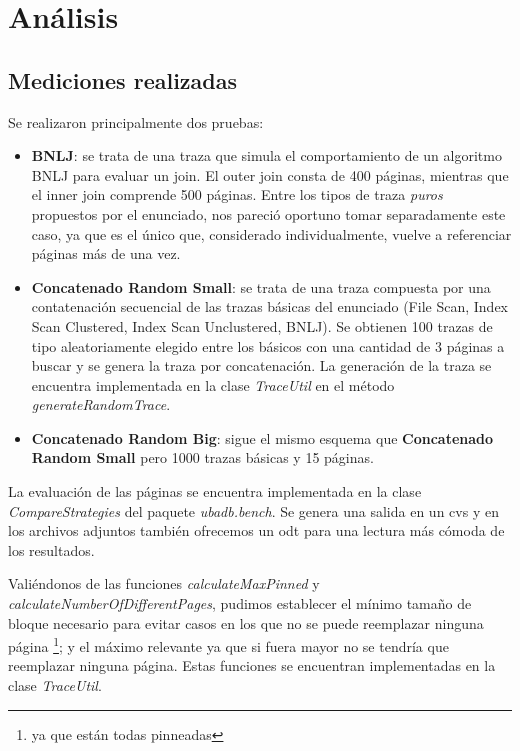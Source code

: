 \section{An\'alisis}

\subsection{Mediciones realizadas}
Se realizaron principalmente dos pruebas:

\begin{itemize}
\item \textbf{BNLJ}: se trata de una traza que simula el comportamiento de un algoritmo BNLJ para evaluar un join. El outer join consta de 400 p\'aginas, mientras que el inner join comprende 500 p\'aginas. Entre los tipos de traza \textit{puros} propuestos por el enunciado, nos pareci\'o oportuno tomar separadamente este caso, ya que es el \'unico que, considerado individualmente, vuelve a referenciar p\'aginas m\'as de una vez. 
\item \textbf{Concatenado Random Small}: se trata de una traza compuesta por una contatenaci\'on secuencial de las trazas b\'asicas del enunciado (File Scan, Index Scan Clustered, Index Scan Unclustered, BNLJ). Se obtienen 100 trazas de tipo aleatoriamente elegido entre los b\'asicos con una cantidad de 3 p\'aginas a buscar y se genera la traza por concatenaci\'on. La generaci\'on de la traza se encuentra implementada en la clase \textit{TraceUtil} en el m\'etodo \textit{generateRandomTrace}.
\item \textbf{Concatenado Random Big}: sigue el mismo esquema que \textbf{Concatenado Random Small} pero 1000 trazas b\'asicas y 15 p\'aginas.


\end{itemize}

La evaluaci\'on de las p\'aginas se encuentra implementada en la clase \textit{CompareStrategies} del paquete \textit{ubadb.bench}. Se genera una salida en un cvs y en los archivos adjuntos tambi\'en ofrecemos un odt para una lectura m\'as c\'omoda de los resultados.

Vali\'endonos de las funciones \textit{calculateMaxPinned} y \textit{calculateNumberOfDifferentPages}, pudimos establecer el m\'inimo tama\~no de bloque necesario para evitar casos en los que no se puede reemplazar ninguna p\'agina \footnote{ya que est\'an todas pinneadas}; y el m\'aximo relevante ya que si fuera mayor no se tendr\'ia que reemplazar ninguna p\'agina. Estas funciones se encuentran implementadas en la clase \textit{TraceUtil}.

